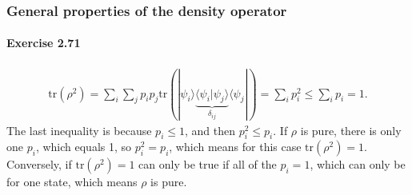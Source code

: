 \documentclass[a4paper,12pt]{article}
\newcommand{\exercise}[1]{\paragraph{Exercise #1}}
\newcommand{\la}{\langle}
\newcommand{\ra}{\rangle}
\begin{document}
    \setcounter{subsubsection}{1}
    \subsubsection{General properties of the density operator}

    \exercise{2.71}
    \begin{gather}
        \textrm{tr}(\rho^2) = \sum_i \sum_j p_i p_j \textrm{tr}( | \psi_i \ra \underbrace{\la \psi_i | \psi_j \ra}_{\delta_{ij}} \la \psi_j | ) =
        \sum_i p_i^2 \leq \sum_i p_i = 1 \textrm{.}
    \end{gather}
    The last inequality is because $p_i \leq 1$, and then $p_i^2 \leq p_i$. If $\rho$ is pure, there is only one $p_i$, which equals 1, so $p_i^2 = p_i$, which means for this case $\textrm{tr}(\rho^2) = 1$. Conversely, if $\textrm{tr}(\rho^2) = 1$ can only be true if all of the $p_i = 1$, which can only be for one state, which means $\rho$ is pure.
\end{document}
